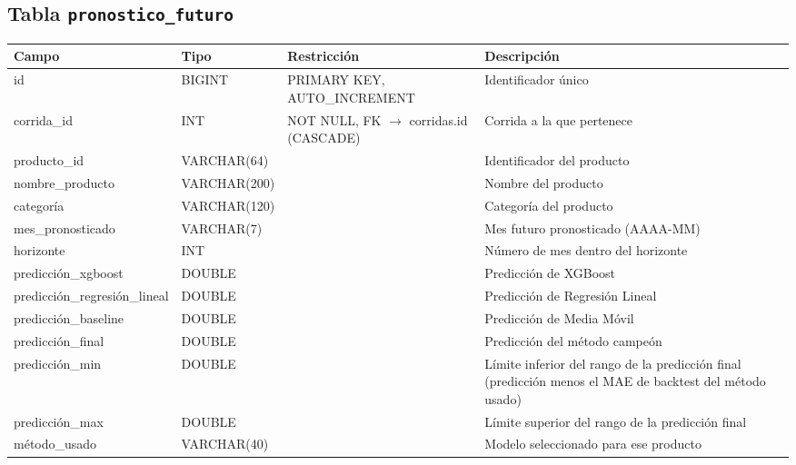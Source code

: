\subsection*{Tabla \texttt{pronostico\_futuro}}
\begin{table}[H]
\centering
\renewcommand{\arraystretch}{1.3}
\begin{tabularx}{\textwidth}{|>{\raggedright\arraybackslash}p{3.0cm}|l|>{\raggedright\arraybackslash}p{3.2cm}|X|}
\hline
\textbf{Campo} & \textbf{Tipo} & \textbf{Restricción} & \textbf{Descripción} \\
\hline
id & BIGINT & PRIMARY KEY, AUTO\_\discretionary{}{}{}INCREMENT & Identificador único \\
\hline
corrida\_\discretionary{}{}{}id & INT & NOT NULL, FK $\to$ corridas.id (CASCADE) & Corrida a la que pertenece \\
\hline
producto\_\discretionary{}{}{}id & VARCHAR(64) & & Identificador del producto \\
\hline
nombre\_\discretionary{}{}{}producto & VARCHAR(200) & & Nombre del producto \\
\hline
categoría & VARCHAR(120) & & Categoría del producto \\
\hline
mes\_\discretionary{}{}{}pronosticado & VARCHAR(7) & & Mes futuro pronosticado (AAAA-MM) \\
\hline
horizonte & INT & & Número de mes dentro del horizonte \\
\hline
predicción\_\discretionary{}{}{}xgboost & DOUBLE & & Predicción de XGBoost \\
\hline
predicción\_\discretionary{}{}{}regresión\_\discretionary{}{}{}lineal & DOUBLE & & Predicción de Regresión Lineal \\
\hline
predicción\_\discretionary{}{}{}baseline & DOUBLE & & Predicción de Media Móvil \\
\hline
predicción\_\discretionary{}{}{}final & DOUBLE & & Predicción del método campeón \\
\hline
predicción\_\discretionary{}{}{}min & DOUBLE & & Límite inferior del rango de la predicción final (predicción menos el MAE de backtest del método usado) \\
\hline
predicción\_\discretionary{}{}{}max & DOUBLE & & Límite superior del rango de la predicción final \\
\hline
método\_\discretionary{}{}{}usado & VARCHAR(40) & & Modelo seleccionado para ese producto \\
\hline
\end{tabularx}
\end{table}


